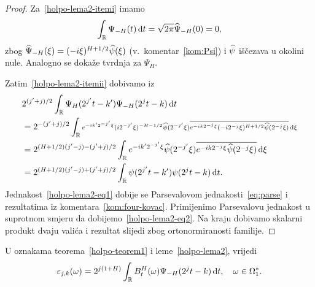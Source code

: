 \documentclass[main.tex]{subfiles}
\begin{document}
\begin{proof}
	Za~\ref{holpo-lema2-itemi} imamo
	\[
		\int_{\mathbb{R}} \Psi_{-H}(t) \,\mathrm d t = \sqrt{2\pi} \widehat{\Psi} _{-H} (0) = 0,
	\]
	zbog \( \widehat{\Psi}_{-H}(\xi) = (-i\xi)^{H+1/2}\widehat{\psi}(\xi) \) (v.~komentar~\ref{kom:Psi}) i \( \widehat{\psi} \)
	iščezava u okolini nule. Analogno se dokaže tvrdnja za \( \Psi_H \).

	Zatim~\ref{holpo-lema2-itemii} dobivamo iz
	\begin{align}\noindent
		 & 2^{( j'+j)/2} \int_\R \Psi_H(2^{j'}t-k')\Psi_{-H}(2^jt-k) \D t                                 \\
		 & = 2^{-(j'+j)/2}
		\int_\R  \scriptstyle{e^{-ik'2^{-j'}\xi}  (i2^{-j'}\xi)^{-H-1/2}\wh\psi(2^{-j'}\xi) \label{holpo-lema2-eq1}
		\ol{e^{-ik2^{-j}\xi}(-i2^{-j}\xi)^{H+1/2}\wh\psi(2^{-j}\xi)}\D \xi}                               \\
		 & = 2^{(H+1/2)(j'-j)-(j'+j)/2}\int_\R e^{-ik'2^{-j'}\xi}\wh\psi(2^{-j'}\xi)
		\ol{e^{-ik2^{-j}\xi}\wh\psi(2^{-j}\xi)} \D \xi                                                    \\
		 & = 2^{(H+1/2)(j'-j)+(j'+j)/2}\int_\R \psi(2^{j'}t-k')\psi(2^jt-k) \D t. \label{holpo-lema2-eq2}
	\end{align}
	Jednakost~\eqref{holpo-lema2-eq1} dobije se Parsevalovom jednakosti~\eqref{eq:parse}
	i rezultatima iz komentara~\ref{kom:four-kovac}. Primijenimo Parsevalovu jednakost u suprotnom smjeru
	da dobijemo~\eqref{holpo-lema2-eq2}. Na kraju dobivamo skalarni produkt dvaju valića i rezultat slijedi
	zbog ortonormiranosti familije.
\end{proof}

\begin{propozicija}\label{holpo-prop2}
	U oznakama teorema~\ref{holpo-teorem1} i leme~\ref{holpo-lema2}, vrijedi
	\begin{equation}
		\varepsilon_{j,k}(\omega) = 2^{j(1+H)}\int_{\mathbb{R}} B^H_t(\omega)\Psi_{-H}(2^jt-k) \,\mathrm d t, \quad \omega \in \Omega_1^*.
	\end{equation}
\end{propozicija}
\end{document}
